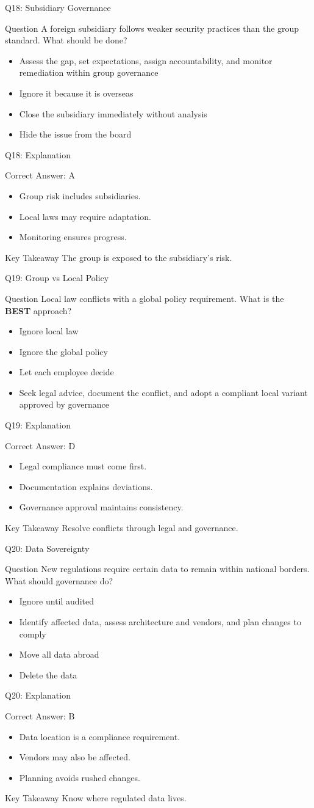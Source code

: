 \documentclass[aspectratio=169]{beamer}
\newcommand{\hq}[7]{%
	\begin{frame}{Q#1: #2}
		\begin{block}{Question}
			#3
		\end{block}
		\begin{itemize}
			#4
		\end{itemize}
	\end{frame}
	\begin{frame}{Q#1: Explanation}
		\begin{block}{Correct Answer: #5}
			\begin{itemize}
				#6
			\end{itemize}
		\end{block}
		\begin{alertblock}{Key Takeaway}
			#7
		\end{alertblock}
	\end{frame}
}
\begin{document}
	\hq{18}{Subsidiary Governance}
	{A foreign subsidiary follows weaker security practices than the group standard. What should be done?}
	{\item[\textbf{(A)}] Assess the gap, set expectations, assign accountability, and monitor remediation within group governance
		\item[\textbf{(B)}] Ignore it because it is overseas
		\item[\textbf{(C)}] Close the subsidiary immediately without analysis
		\item[\textbf{(D)}] Hide the issue from the board}
	{A}
	{\item Group risk includes subsidiaries.
		\item Local laws may require adaptation.
		\item Monitoring ensures progress.}
	{The group is exposed to the subsidiary's risk.}

	\hq{19}{Group vs Local Policy}
	{Local law conflicts with a global policy requirement. What is the \textbf{BEST} approach?}
	{\item[\textbf{(A)}] Ignore local law
		\item[\textbf{(B)}] Ignore the global policy
		\item[\textbf{(C)}] Let each employee decide
		\item[\textbf{(D)}] Seek legal advice, document the conflict, and adopt a compliant local variant approved by governance}
	{D}
	{\item Legal compliance must come first.
		\item Documentation explains deviations.
		\item Governance approval maintains consistency.}
	{Resolve conflicts through legal and governance.}

	\hq{20}{Data Sovereignty}
	{New regulations require certain data to remain within national borders. What should governance do?}
	{\item[\textbf{(A)}] Ignore until audited
		\item[\textbf{(B)}] Identify affected data, assess architecture and vendors, and plan changes to comply
		\item[\textbf{(C)}] Move all data abroad
		\item[\textbf{(D)}] Delete the data}
	{B}
	{\item Data location is a compliance requirement.
		\item Vendors may also be affected.
		\item Planning avoids rushed changes.}
	{Know where regulated data lives.}
\end{document}
